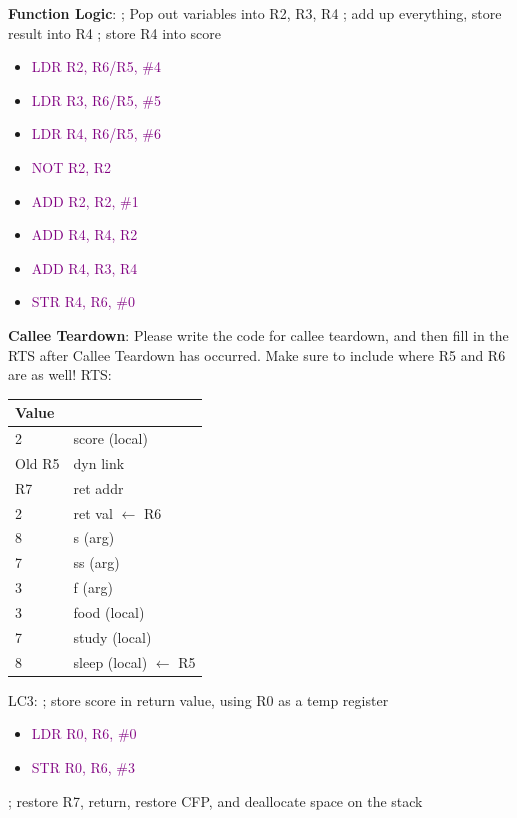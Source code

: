 \documentclass{article}
\begin{document}
\textbf{Function Logic}:
\newline
; Pop out variables into R2, R3, R4
\newline
; add up everything, store result into R4
\newline
; store R4 into score
\newline
 \begin{itemize}
    \item \textcolor{purple}{LDR R2, R6/R5, \#4}
    \item \textcolor{purple}{LDR R3, R6/R5, \#5}
    \item \textcolor{purple}{LDR R4, R6/R5, \#6}
    \item \textcolor{purple}{NOT R2, R2}
    \item \textcolor{purple}{ADD R2, R2, \#1}
    \item \textcolor{purple}{ADD R4, R4, R2}
    \item \textcolor{purple}{ADD R4, R3, R4} 
    \item \textcolor{purple}{STR R4, R6, \#0}
    
\end{itemize}

\newpage


\textbf{Callee Teardown}: Please write the code for callee teardown, and then fill in the RTS after Callee Teardown has occurred. Make sure to include where R5 and R6 are as well! \newline
RTS:
\begin{center}

\begin{tabular}{|p{3cm} p{5cm} |} 
\hline
 Value &   \\ [0.5ex] 
 \hline \hline
 2 & score (local)  \\
 \hline
 Old R5 & dyn link \\
 \hline
 R7 & ret addr \\
 \hline
 2 & ret val $\xleftarrow{}$ R6\\
 \hline
 8 & s (arg) \\ 
 \hline
 7 & ss (arg)\\
 \hline
 3 & f (arg) \\
 \hline
 3 & food (local) \\
 \hline
 7 & study (local)\\ [1ex]
 \hline
  8 & sleep (local) $\xleftarrow{}$ R5\\ [1ex]
  \hline
 
\end{tabular}
\end{center}
LC3:
\newline
; store score in return value, using R0 as a temp register
\begin{itemize}
    \item \textcolor{purple}{LDR R0, R6, \#0}
    \item \textcolor{purple}{STR R0, R6, \#3}
\end{itemize}
; restore R7, return, restore CFP, and deallocate space on the stack
\end{document}

